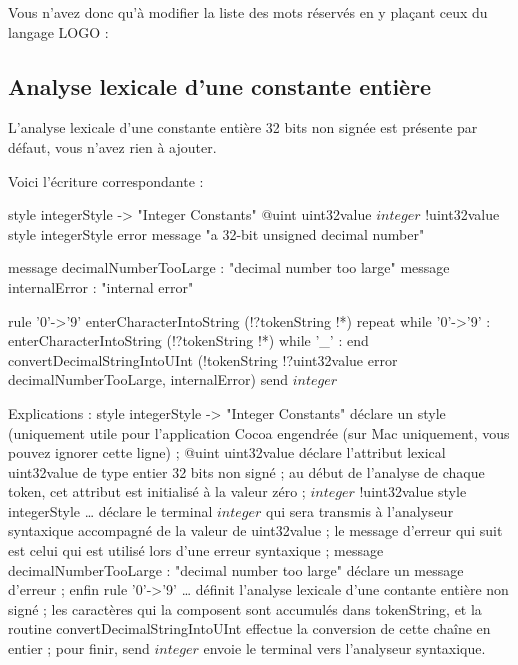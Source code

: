 Vous n’avez donc qu’à modifier la liste des mots réservés en y plaçant ceux du langage LOGO :

\subsection{Analyse lexicale d'une constante entière}

L’analyse lexicale d’une constante entière 32 bits non signée est présente par défaut, vous n’avez rien à ajouter.

Voici l'écriture correspondante :
\begin{galgascode}
style integerStyle -> "Integer Constants"
@uint uint32value
$integer$ !uint32value style integerStyle error message "a 32-bit unsigned decimal number"

message decimalNumberTooLarge : "decimal number too large"
message internalError : "internal error"

rule '0'->'9' {
  enterCharacterIntoString (!?tokenString !*)
  repeat
  while '0'->'9' :
    enterCharacterIntoString (!?tokenString !*)
  while '_' :
  end
  convertDecimalStringIntoUInt (!tokenString !?uint32value error decimalNumberTooLarge, internalError)
  send $integer$
}
\end{galgascode}


Explications :
style integerStyle -> "Integer Constants" déclare un style (uniquement utile pour l’application Cocoa engendrée (sur Mac uniquement, vous pouvez ignorer cette ligne) ;
@uint uint32value déclare l’attribut lexical uint32value de type entier 32 bits non signé ; au début de l’analyse de chaque token, cet attribut est initialisé à la valeur zéro ;
$integer$ !uint32value style integerStyle … déclare le terminal $integer$ qui sera transmis à l’analyseur syntaxique accompagné de la valeur de uint32value ;  le message d’erreur qui suit est celui qui est utilisé lors d’une erreur syntaxique ;
message decimalNumberTooLarge : "decimal number too large" déclare un message d’erreur ;
enfin rule '0'->'9' … définit l’analyse lexicale d’une contante entière non signé ; les caractères qui la composent sont accumulés dans tokenString, et la routine convertDecimalStringIntoUInt effectue la conversion de cette chaîne en entier ; pour finir, send $integer$ envoie le terminal vers l’analyseur syntaxique.

